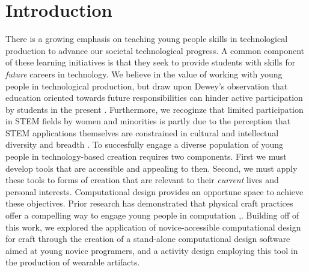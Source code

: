 \documentclass{sigchi}
\begin{document}
\section{Introduction} %
There is a growing emphasis on teaching young people skills in technological production to advance our societal technological progress. A common component of these learning initiatives is that they seek to provide students with skills for \textit{future} careers in technology. We believe in the value of working with young people in technological production, but draw upon Dewey's observation that education oriented towards future responsibilities can hinder active participation by students in the present \cite{dewey}. Furthermore, we recoginze that limited participation in STEM fields by women and minorities is partly due to the perception that STEM applications themselves are constrained in cultural and intellectual diversity and breadth \cite{buechley_wild}. To succesfully engage a diverse population of young people in technology-based creation requires two components. First we must develop tools that are accessible and appealing to then.  Second, we must apply these tools to forms of creation that are relevant to their \emph{current} lives and personal interests. Computational design provides an opportune space to achieve these objectives. Prior research has demonstrated that physical craft practices offer a compelling way to engage young people in computation \cite{buechley_comptext},\cite{codeable_objects}. Building off of this work, we explored the application of novice-accessible computational design for craft through the creation of a stand-alone computational design software aimed at young novice programers, and a activity design employing this tool in the production of wearable artifacts.

\end{document}
